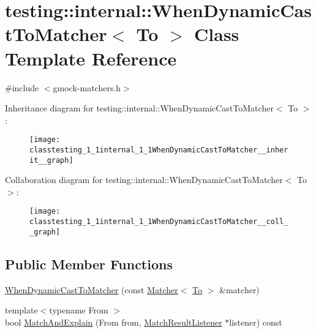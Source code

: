 \hypertarget{classtesting_1_1internal_1_1WhenDynamicCastToMatcher}{}\section{testing\+:\+:internal\+:\+:When\+Dynamic\+Cast\+To\+Matcher$<$ To $>$ Class Template Reference}
\label{classtesting_1_1internal_1_1WhenDynamicCastToMatcher}


{\ttfamily \#include $<$gmock-\/matchers.\+h$>$}



Inheritance diagram for testing\+:\+:internal\+:\+:When\+Dynamic\+Cast\+To\+Matcher$<$ To $>$\+:\nopagebreak
\begin{figure}[H]
\begin{center}
\leavevmode
\texttt{[image: classtesting\_1\_1internal\_1\_1WhenDynamicCastToMatcher\_\_inherit\_\_graph]}
\end{center}
\end{figure}


Collaboration diagram for testing\+:\+:internal\+:\+:When\+Dynamic\+Cast\+To\+Matcher$<$ To $>$\+:\nopagebreak
\begin{figure}[H]
\begin{center}
\leavevmode
\texttt{[image: classtesting\_1\_1internal\_1\_1WhenDynamicCastToMatcher\_\_coll\_\_graph]}
\end{center}
\end{figure}
\subsection*{Public Member Functions}
\begin{DoxyCompactItemize}
\item 
\hyperlink{classtesting_1_1internal_1_1WhenDynamicCastToMatcher_a44e444d218197f8180c5ac7fca135f9a}{When\+Dynamic\+Cast\+To\+Matcher} (const \hyperlink{classtesting_1_1Matcher}{Matcher}$<$ \hyperlink{classtesting_1_1internal_1_1To}{To} $>$ \&matcher)
\item 
{\footnotesize template$<$typename From $>$ }\\bool \hyperlink{classtesting_1_1internal_1_1WhenDynamicCastToMatcher_afea5e5230fa9955bfdf9902587c44676}{Match\+And\+Explain} (From from, \hyperlink{classtesting_1_1MatchResultListener}{Match\+Result\+Listener} $\ast$listener) const 
\end{DoxyCompactItemize}
